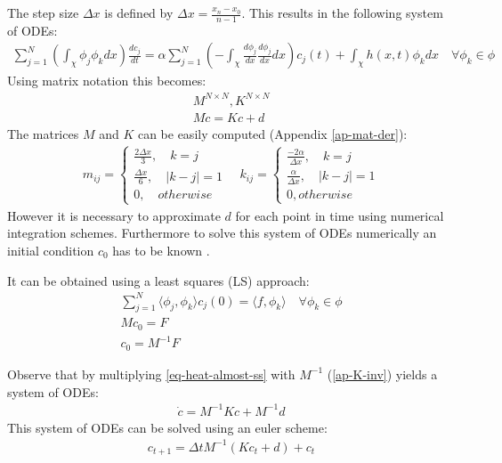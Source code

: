 The step size \(\Delta x\) is defined by \(\Delta x = \frac{x_n - x_0}{n-1}\). \label{def-delta-x}
This results in the following system of ODEs:
\begin{gather}
\sum_{j=1}^N(\int_{\chi} \phi_{j}\phi_{k}dx)\frac{dc_{j}}{dt} = \alpha \sum_{j = 1}^N(-\int_{\chi} \frac{d\phi_{j}}{dx}\frac{d\phi_{j}}{dx}dx)c_{j}(t) + \int_{\chi}h(x, t) \phi_{k} dx
\quad \forall \phi_{k} \in \phi \label{eq-heat-fem}
\end{gather}
Using matrix notation this becomes:
\begin{gather}
M^{N \times N}, K^{N \times N} \\
M\dot{c} = Kc + d \label{eq-heat-almost-ss}
\end{gather}
The matrices \(M\) and \(K\) can be easily computed (Appendix \ref{ap-mat-der}):
\begin{gather}
m_{ij} = \begin{cases}
\frac{2\Delta x}{3}, \quad k = j \\
\frac{\Delta x}{6}, \quad |k - j| = 1 \\
0, \quad otherwise 
\end{cases} \label{def-mat-a}
\quad
k_{ij} = \begin{cases}
\frac{-2\alpha}{\Delta x}, \quad k = j \\
\frac{\alpha}{\Delta x}, \quad |k - j| = 1 \\
0, otherwise
\end{cases}
\end{gather}
However it is necessary to approximate \(d\) for each point in time using numerical integration schemes.
Furthermore to solve this system of ODEs numerically an initial condition \(c_{0}\) has to be known 
\cite{Gustafsson2011b}.


It can be obtained using a least squares (LS) approach:
\begin{gather}
\sum_{j = 1}^N \langle \phi_j, \phi_k \rangle c_{j}(0) = \langle f, \phi_{k} \rangle \quad \forall \phi_k \in \phi \\
Mc_{0} = F \label{F}\\ 
c_{0} = M^{-1}F  \label{c0}
\end{gather}
\cite{Gustafsson2011c}

Observe that by multiplying \ref{eq-heat-almost-ss} with \(M^{-1}\) (\ref{ap-K-inv}) yields a system of ODEs:
\begin{gather}
\dot{c} = M^{-1}Kc + M^{-1}d \label{almost-almost-ss}
\end{gather}
This system of ODEs can be solved using an euler scheme:
\begin{gather}
c_{t+1} = \Delta t M^{-1}(Kc_{t} + d) + c_{t} \label{fem-euler}
\end{gather}
